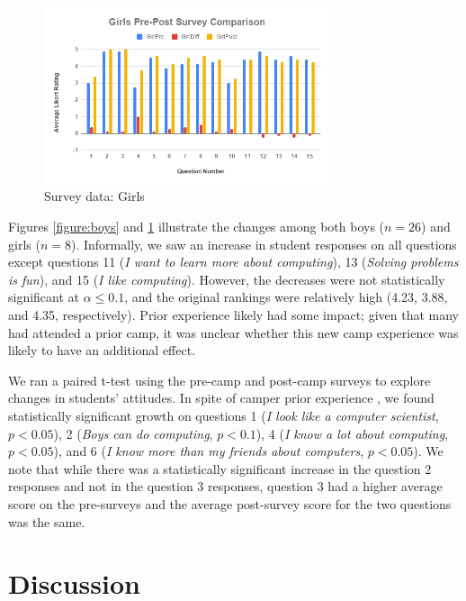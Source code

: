 \begin{figure}
\includegraphics[width=3.3in]{images/girls}
\caption{Survey data: Girls}
\label{figure:girls}
\end{figure}

Figures \ref{figure:boys} and \ref{figure:girls} illustrate the changes
among both boys ($n=26$) and girls ($n=8$).
Informally, we saw an increase in student responses on all questions
except questions 11 (\textit{I want to learn more about computing}), 
13 (\textit{Solving problems is fun}), and 15 (\textit{I like computing}).
However, the decreases were not statistically significant at $\alpha\le 0.1$,
and the original rankings were relatively high (4.23, 3.88, and 4.35,
respectively).  Prior experience likely had some impact;
given that many had attended a prior camp, it was unclear whether this
new camp experience was likely to have an additional effect.

We ran a paired t-test using the pre-camp and post-camp surveys to
explore changes in students' attitudes.  In spite of camper prior
experience , we found statistically significant growth on questions
1 (\textit{I look like a computer scientist}, $p < 0.05$), 2
(\textit{Boys can do computing}, $p < 0.1$), 4 (\textit{I know a
lot about computing}, $p < 0.05$), and 6 (\textit{I know more than
my friends about computers}, $p < 0.05$).  We note that while there
was a statistically significant increase in the question 2 responses
and not in the question 3 responses, question 3 had a higher average
score on the pre-surveys and the average post-survey score for the two
questions was the same.


\section{Discussion}

